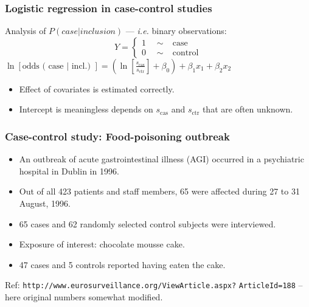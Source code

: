 \documentclass[handout,12pt,dvipsnames,t]{beamer}
\begin{document}
\begin{frame}[fragile]
  \frametitle{Logistic regression in case-control studies}
  
  Analysis of $P(case | inclusion)$ --- \textit{i.e.} binary
observations:
$$
Y=\left\{ \begin{array}{ll}
          1 \quad \sim & \mbox{case}\\
          0 \quad \sim & \mbox{control}
                    \end{array} \right.
$$
$\ln[\mbox{odds ( case | incl.) }] =
 \left( \ln\left[\frac{s_\text{cas}}{s_\text{ctr}}\right] + \beta_0 \right)
         + \beta_1 x_1 + \beta_2 x_2$
\vspace*{1cm}
\begin{itemize}
\item Effect of covariates is estimated correctly.
\item Intercept is meaningless \newline
\hspace*{0.5cm} depends on $s_\text{cas}$ and $s_\text{ctr}$
  that are often unknown.

\end{itemize}
\end{frame}

\begin{frame}[fragile]
\frametitle{Case-control study: Food-poisoning outbreak}

\begin{itemize} %
\item An outbreak of acute gastrointestinal illness (AGI) occurred in
  a psychiatric hospital in Dublin in 1996.
\item Out of all 423 patients and staff members, 65 were
  affected during 27 to 31 August, 1996.
\item 65 cases and 62 randomly selected control subjects were
  interviewed.
\item Exposure of interest: chocolate mousse cake.
\item 47 cases and 5 controls reported having eaten the cake.
\end{itemize}

{\small Ref: \verb|http://www.eurosurveillance.org/ViewArticle.aspx?|}
{\small \verb|ArticleId=188|} -- here original numbers somewhat modified.
\end{frame}
\end{document}

